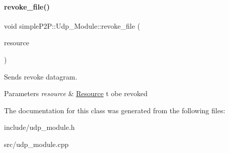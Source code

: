 \paragraph{\texorpdfstring{revoke\+\_\+file()}{revoke\_file()}}
{\footnotesize\ttfamily void simple\+P2\+P\+::\+Udp\+\_\+\+Module\+::revoke\+\_\+file (\begin{DoxyParamCaption}\item[{const \hyperlink{classsimpleP2P_1_1Resource}{Resource} \&}]{resource }\end{DoxyParamCaption})}



Sends revoke datagram. 


\begin{DoxyParams}{Parameters}
{\em resource} & \hyperlink{classsimpleP2P_1_1Resource}{Resource} t obe revoked \\
\hline
\end{DoxyParams}


The documentation for this class was generated from the following files\+:\begin{DoxyCompactItemize}
\item 
include/udp\+\_\+module.\+h\item 
src/udp\+\_\+module.\+cpp\end{DoxyCompactItemize}
